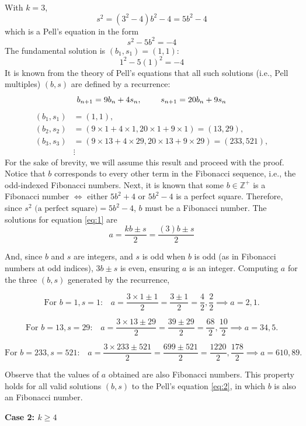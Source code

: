 \documentclass[10pt]{article}
\def\HS{\hspace{\fontdimen2\font}}
\theoremstyle{plain}
\theoremstyle{definition}
\theoremstyle{remark}
\begin{document}
With \(k=3\), \[s^2=(3^2-4)b^2-4=5b^2-4\] which is a Pell's equation in the form \begin{equation} \label{eq:2}s^2-5b^2=-4 \end{equation} The fundamental solution is \((b_1,s_1)=(1,1)\): \[1^2-5(1)^2=-4\] It is known from the theory of Pell's equations that all such solutions (i.e., Pell multiples) \((b,s)\) are defined by a recurrence: \[b_{n+1}=9b_n+4s_n, \HS\HS\HS\HS\HS\HS\HS s_{n+1}=20b_n+9s_n\] \begin{align*}
(b_1, s_1) &= (1, 1), \\
(b_2, s_2) &= (9 \times 1 + 4 \times 1, 20 \times 1 + 9 \times 1) = (13, 29), \\
(b_3, s_3) &= (9 \times 13 + 4 \times 29, 20 \times 13 + 9 \times 29) = (233, 521), \\
&\vdots
\end{align*}
For the sake of brevity, we will assume this result and proceed with the proof. Notice that \(b\) corresponds to every other term in the Fibonacci sequence, i.e., the odd-indexed Fibonacci numbers. Next, it is known that some \(b\in \mathbb{Z}^+\) is a Fibonacci number \(\iff\) either \(5b^2+4\) or \(5b^2-4\) is a perfect square. Therefore, since \(s^2 \text{ (a perfect square)}=5b^2-4\), \(b\) must be a Fibonacci number. The solutions for equation \ref{eq:1} are \[a=\frac{kb\pm s}{2}=\frac{(3)b\pm s}{2}\]

And, since \(b\) and \(s\) are integers, and \(s\) is odd when \(b\) is odd (as in Fibonacci numbers at odd indices), 
\(3b\pm s\) is even, ensuring \(a\) is an integer. Computing \(a\) for the three \((b,s)\) generated by the recurrence, 

\[
\text{For \(b = 1, s = 1\):} \quad a = \frac{3 \times 1 \pm 1}{2} = \frac{3 \pm 1}{2} = \frac{4}{2}, \frac{2}{2} \implies a = 2, 1.
\]

\[
\text{For \(b = 13, s = 29\):} \quad a = \frac{3 \times 13 \pm 29}{2} = \frac{39 \pm 29}{2} = \frac{68}{2}, \frac{10}{2} \implies a = 34, 5.
\]

\[
\text{For \(b = 233, s = 521\):} \quad a = \frac{3 \times 233 \pm 521}{2} = \frac{699 \pm 521}{2} = \frac{1220}{2}, \frac{178}{2} \implies a = 610, 89.
\]

Observe that the values of \(a\) obtained are also Fibonacci numbers. This property holds for all valid solutions \((b,s)\) to the Pell's equation \ref{eq:2}, in which \(b\) is also an Fibonacci number.

\textbf{Case 2: \(k\geq4\)}\
\end{document}
